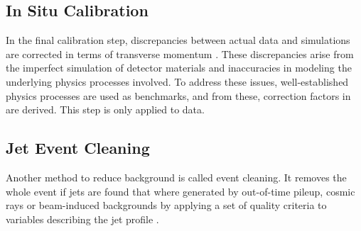 \subsection{In Situ Calibration}
In the final calibration step, discrepancies between actual data and simulations are corrected in terms of transverse momentum \pt. These discrepancies arise from the imperfect simulation of detector materials and inaccuracies in modeling the underlying physics processes involved. To address these issues, well-established physics processes are used as benchmarks, and from these, correction factors in \pt are derived. This step is only applied to data.

\subsection{Jet Event Cleaning}
Another method to reduce background is called event cleaning. It removes the whole event if jets are found that where generated by out-of-time pileup, cosmic rays or beam-induced backgrounds by applying a set of quality criteria to variables describing the jet profile \citep{ATLAS-CONF-2015-029}.

